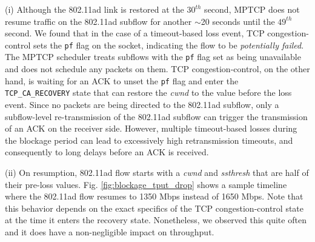 \noindent(i) Although the 802.11ad link is restored at the $30^{th}$
second, MPTCP does not resume traffic on the 802.11ad subflow for
another $\sim$20 seconds until the $49^{th}$ second. We found that in
the case of a timeout-based loss event, TCP congestion-control sets
the {\tt pf} flag on the socket, indicating the flow to be
\emph{potentially failed}. The MPTCP scheduler treats subflows with
the {\tt pf} flag set as being unavailable and does not schedule any
packets on them. TCP congestion-control, on the other hand, is waiting
for an ACK to unset the {\tt pf} flag and enter the {\tt
  TCP\_CA\_RECOVERY} state that can restore the \emph{cwnd} to the
value before the loss event. Since no packets are being directed to
the 802.11ad subflow, only a subflow-level re-transmission of the
802.11ad subflow can trigger the transmission of an ACK on the
receiver side. However, multiple timeout-based losses during the
blockage period can lead to excessively high retransmission timeouts,
and consequently to long delays before an ACK is received.

\noindent(ii) On
resumption, 802.11ad flow starts with a \emph{cwnd} and
\emph{ssthresh} that are half of their pre-loss
values. Fig. \ref{fig:blockage_tput_drop} shows a sample timeline
where the 802.11ad flow resumes to 1350 Mbps instead of 1650
Mbps. Note that this behavior depends on the exact specifics of the
TCP congestion-control state at the time it enters the recovery
state. Nonetheless, we observed this quite often and it does have a
non-negligible impact on throughput.

